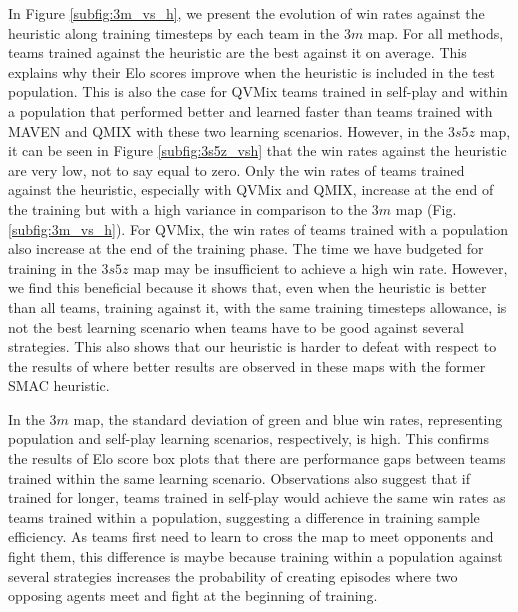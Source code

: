 \begin{figure}
    
\end{figure}

In Figure \ref{subfig:3m_vs_h}, we present the evolution of win rates against the heuristic along training timesteps by each team in the $3m$ map.
For all methods, teams trained against the heuristic are the best against it on average.
This explains why their Elo scores improve when the heuristic is included in the test population.
This is also the case for QVMix teams trained in self-play and within a population that performed better and learned faster than teams trained with MAVEN and QMIX with these two learning scenarios.
However, in the $3s5z$ map, it can be seen in Figure \ref{subfig:3s5z_vsh} that the win rates against the heuristic are very low, not to say equal to zero.
Only the win rates of teams trained against the heuristic, especially with QVMix and QMIX, increase at the end of the training but with a high variance in comparison to the $3m$ map (Fig. \ref{subfig:3m_vs_h}).
For QVMix, the win rates of teams trained with a population also increase at the end of the training phase.
The time we have budgeted for training in the $3s5z$ map may be insufficient to achieve a high win rate.
However, we find this beneficial because it shows that, even when the heuristic is better than all teams, training against it, with the same training timesteps allowance, is not the best learning scenario when teams have to be good against several strategies.
This also shows that our heuristic is harder to defeat with respect to the results of \citep{Rashid2018,Mahajan2019MAVEN:Exploration,leroy2020qvmix} where better results are observed in these maps with the former SMAC heuristic.

In the $3m$ map, the standard deviation of green and blue win rates, representing population and self-play learning scenarios, respectively, is high.
This confirms the results of Elo score box plots that there are performance gaps between teams trained within the same learning scenario.
Observations also suggest that if trained for longer, teams trained in self-play would achieve the same win rates as teams trained within a population, suggesting a difference in training sample efficiency.
As teams first need to learn to cross the map to meet opponents and fight them, this difference is maybe because training within a population against several strategies increases the probability of creating episodes where two opposing agents meet and fight at the beginning of training.

